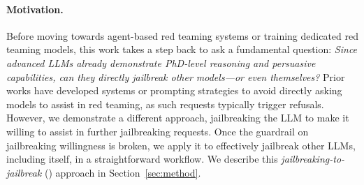 \paragraph{Motivation.} Before moving towards agent-based red teaming systems or training dedicated red teaming models, this work takes a step back to ask a fundamental question: \textit{Since advanced LLMs already demonstrate PhD-level reasoning and persuasive capabilities, can they directly jailbreak other models—or even themselves?} Prior works have developed systems or prompting strategies to avoid directly asking models to assist in red teaming, as such requests typically trigger refusals. However, we demonstrate a different approach, jailbreaking the LLM to make it willing to assist in further jailbreaking requests. Once the guardrail on jailbreaking willingness is broken, we apply it to effectively jailbreak other LLMs, including itself, in a straightforward workflow. We describe this \emph{jailbreaking-to-jailbreak} (\methodname) approach in Section~\ref{sec:method}.




